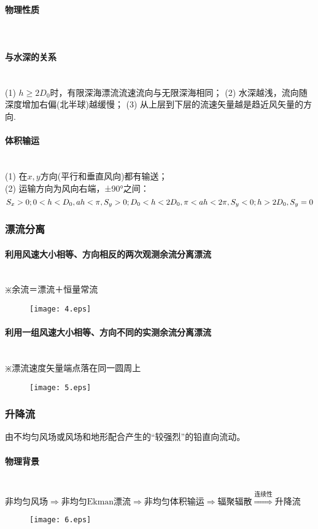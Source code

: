 \documentclass[a4paper,12pt]{article}
\begin{document}
    \paragraph{物理性质}~{}
    \paragraph{与水深的关系}~{}\\
    (1) $h≥2D_0$时，有限深海漂流流速流向与无限深海相同；
    (2) 水深越浅，流向随深度增加右偏(北半球)越缓慢；
    (3) 从上层到下层的流速矢量越是趋近风矢量的方向.
    \paragraph{体积输运}~{}\\
    (1) 在$x,y$方向(平行和垂直风向)都有输送；\\
    (2) 运输方向为风向右端，±90°之间：\\
        $$\displaystyle S_x>0;\\0<h<D_0,ah<\pi,S_y>0;D_0<h<2D_0,\pi<ah<2\pi,S_y<0;h>2D_0,S_y=0$$
    \subsubsection{漂流分离}
    \paragraph{利用风速大小相等、方向相反的两次观测余流分离漂流}~{}\\
    $\divideontimes$余流＝漂流＋恒量常流
    \begin{figure}[H]
        \centering\texttt{[image: 4.eps]}
        \caption*{}
    \end{figure}
    \paragraph{利用一组风速大小相等、方向不同的实测余流分离漂流}~{}\\
    $\divideontimes$漂流速度矢量端点落在同一圆周上
    \begin{figure}[H]
        \centering\texttt{[image: 5.eps]}
        \caption*{}
    \end{figure}
    \subsubsection{升降流}
    由不均匀风场或风场和地形配合产生的“较强烈”的铅直向流动。
    \paragraph{物理背景}~{}\\
    $\boxed{\mbox{非均匀风场}}\Rightarrow\boxed{\mbox{非均匀Ekman漂流}}\Rightarrow\boxed{\mbox{非均匀体积输运}}\Rightarrow\boxed{\mbox{辐聚辐散}}\mathop{\Rightarrow}\limits^{连续性}\boxed{\mbox{升降流}}$
    \begin{figure}[H]
        \centering\texttt{[image: 6.eps]}
        \caption*{}
    \end{figure}
\end{document}
